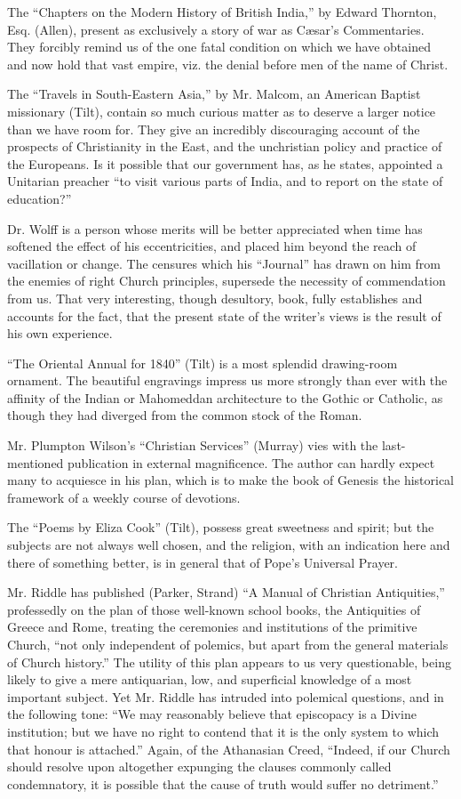 The ``Chapters on the Modern History of British
India,'' by Edward Thornton, Esq. (Allen), present as exclusively a
story of war as Cæsar's Commentaries. They forcibly remind us of the
one fatal condition on which we have obtained and now hold that vast
empire, viz. the denial before men of the name of Christ.

The ``Travels in South-Eastern Asia,'' by Mr.
Malcom, an American Baptist missionary (Tilt), contain so much curious
matter as to deserve a larger notice than we have room for. They give an
incredibly discouraging account of the prospects of Christianity in the
East, and the unchristian policy and practice of the Europeans. Is it
possible that our government has, as he states, appointed a Unitarian
preacher ``to visit various parts of India, and to report on the state
of education?''

Dr. Wolff is a person whose merits will be better
appreciated when time has softened the effect of his eccentricities, and
placed him beyond the reach of vacillation or change. The censures which
his ``Journal'' has drawn on him from the enemies of right Church
principles, supersede the necessity of commendation from us. That very
interesting, though desultory, book, fully establishes and accounts for
the fact, that the present state of the writer's views is the result
of his own experience.

``The Oriental Annual for 1840'' (Tilt) is a most
splendid drawing-room ornament. The beautiful engravings impress us more
strongly than ever with the affinity of the Indian or Mahomeddan
architecture to the Gothic or Catholic, as though they had diverged from
the common stock of the Roman.

Mr. Plumpton Wilson's ``Christian Services''
(Murray) vies with the last-mentioned publication in external
magnificence. The author can hardly expect many to acquiesce in his
plan, which is to make the book of Genesis the historical framework of a
weekly course of devotions.

The ``Poems by Eliza Cook'' (Tilt), possess great
sweetness and spirit; but the subjects are not always well chosen, and
the religion, with an indication here and there of something better, is
in general that of Pope's Universal Prayer.

Mr. Riddle has published (Parker, Strand) ``A
Manual of Christian Antiquities,'' professedly on the plan of those
well-known school books, the Antiquities of Greece and Rome, treating
the ceremonies and institutions of the primitive Church, ``not only
independent of polemics, but apart from the general materials of Church
history.'' The utility of this plan appears to us very questionable,
being likely to give a mere antiquarian, low, and superficial knowledge
of a most important subject. Yet Mr. Riddle has intruded into polemical
questions, and in the following tone: ``We may reasonably believe that
episcopacy is a Divine institution; but we have no right to contend that
it is the only system to which that honour is attached.'' Again, of the
Athanasian Creed, ``Indeed, if our Church should resolve upon
altogether expunging the clauses commonly called condemnatory, it is
possible that the cause of truth would suffer no detriment.''

